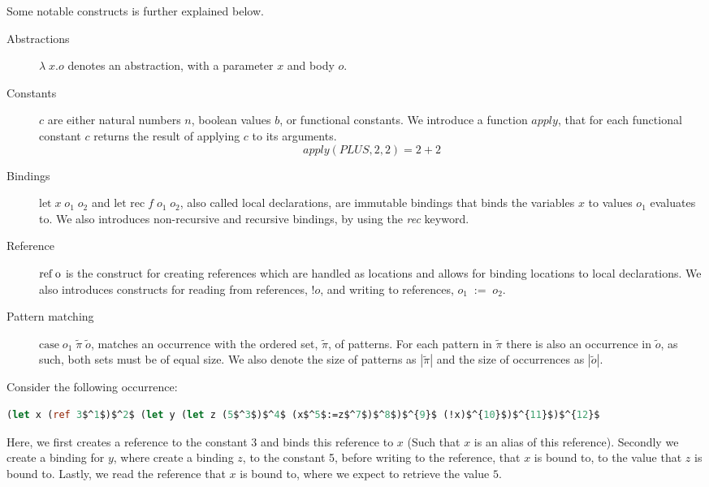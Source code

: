 \documentclass[../../master.tex]{subfiles}
\begin{document}
Some notable constructs is further explained below.
\begin{description}
	\item[Abstractions] $\lambda\;x.o$ denotes an abstraction, with a parameter $x$ and body $o$.

	\item[Constants] $c$ are either natural numbers $n$, boolean values $b$, or functional constants.
		We introduce a function $apply$, that for each functional constant $c$ returns the result of applying $c$ to its arguments.
		$$apply(PLUS,2,2)=2+2$$

	\item[Bindings] $\mbox{let} \; x \; o_1 \; o_2$ and $\mbox{let rec} \; f \; o_1 \; o_2$, also called local declarations, are immutable bindings that binds the variables $x$ to values $o_1$ evaluates to.
		We also introduces non-recursive and recursive bindings, by using the \emph{rec} keyword.

	\item[Reference] $\mbox{ref\;o}$ is the construct for creating references which are handled as locations and allows for binding locations to local declarations.
		We also introduces constructs for reading from references, $!o$, and writing to references, $o_1\;:=\;o_2$.

	\item[Pattern matching] $\mbox{case} \; o_1 \; \tilde{\pi} \; \tilde{o}$, matches an occurrence with the ordered set, $\tilde{\pi}$, of patterns.
		For each pattern in $\tilde{\pi}$ there is also an occurrence in $\tilde{o}$, as such, both sets must be of equal size.
		We also denote the size of patterns as $|\tilde{\pi}|$ and the size of occurrences as $|\tilde{o}|$.
\end{description}

\begin{example}[]\label{ex:write}
Consider the following occurrence:
\begin{lstlisting}[language=Caml, mathescape=true]
(let x (ref 3$^1$)$^2$ (let y (let z (5$^3$)$^4$ (x$^5$:=z$^7$)$^8$)$^{9}$ (!x)$^{10}$)$^{11}$)$^{12}$
\end{lstlisting}
Here, we first creates a reference to the constant 3 and binds this reference to $x$ (Such that $x$ is an alias of this reference).
Secondly we create a binding for $y$, where create a binding $z$, to the constant 5, before writing to the reference, that $x$ is bound to, to the value that $z$ is bound to.
Lastly, we read the reference that $x$ is bound to, where we expect to retrieve the value $5$.
\end{example}
\end{document}

